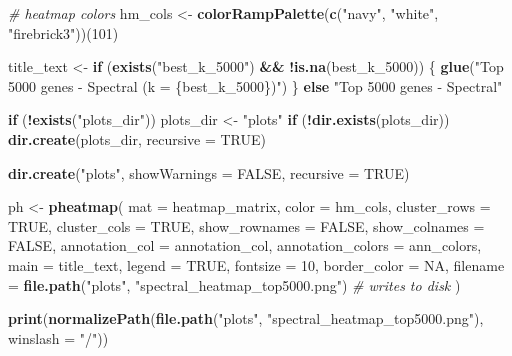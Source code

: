 \documentclass[
]{article}
\newenvironment{Shaded}{\begin{snugshade}}{\end{snugshade}}
\newcommand{\AttributeTok}[1]{\textcolor[rgb]{0.13,0.29,0.53}{#1}}
\newcommand{\CommentTok}[1]{\textcolor[rgb]{0.56,0.35,0.01}{\textit{#1}}}
\newcommand{\ConstantTok}[1]{\textcolor[rgb]{0.56,0.35,0.01}{#1}}
\newcommand{\ControlFlowTok}[1]{\textcolor[rgb]{0.13,0.29,0.53}{\textbf{#1}}}
\newcommand{\DecValTok}[1]{\textcolor[rgb]{0.00,0.00,0.81}{#1}}
\newcommand{\FunctionTok}[1]{\textcolor[rgb]{0.13,0.29,0.53}{\textbf{#1}}}
\newcommand{\NormalTok}[1]{#1}
\newcommand{\OtherTok}[1]{\textcolor[rgb]{0.56,0.35,0.01}{#1}}
\newcommand{\SpecialCharTok}[1]{\textcolor[rgb]{0.81,0.36,0.00}{\textbf{#1}}}
\newcommand{\StringTok}[1]{\textcolor[rgb]{0.31,0.60,0.02}{#1}}
\begin{document}
\begin{Shaded}
\begin{Highlighting}[]
\CommentTok{\# heatmap colors }
\NormalTok{hm\_cols }\OtherTok{\textless{}{-}} \FunctionTok{colorRampPalette}\NormalTok{(}\FunctionTok{c}\NormalTok{(}\StringTok{"navy"}\NormalTok{, }\StringTok{"white"}\NormalTok{, }\StringTok{"firebrick3"}\NormalTok{))(}\DecValTok{101}\NormalTok{)}

\NormalTok{title\_text }\OtherTok{\textless{}{-}} \ControlFlowTok{if}\NormalTok{ (}\FunctionTok{exists}\NormalTok{(}\StringTok{"best\_k\_5000"}\NormalTok{) }\SpecialCharTok{\&\&} \SpecialCharTok{!}\FunctionTok{is.na}\NormalTok{(best\_k\_5000)) \{}
  \FunctionTok{glue}\NormalTok{(}\StringTok{"Top 5000 genes {-} Spectral (k = \{best\_k\_5000\})"}\NormalTok{)}
\NormalTok{\} }\ControlFlowTok{else} \StringTok{"Top 5000 genes {-} Spectral"}


\ControlFlowTok{if}\NormalTok{ (}\SpecialCharTok{!}\FunctionTok{exists}\NormalTok{(}\StringTok{"plots\_dir"}\NormalTok{)) plots\_dir }\OtherTok{\textless{}{-}} \StringTok{"plots"}
\ControlFlowTok{if}\NormalTok{ (}\SpecialCharTok{!}\FunctionTok{dir.exists}\NormalTok{(plots\_dir)) }\FunctionTok{dir.create}\NormalTok{(plots\_dir, }\AttributeTok{recursive =} \ConstantTok{TRUE}\NormalTok{)}

\FunctionTok{dir.create}\NormalTok{(}\StringTok{"plots"}\NormalTok{, }\AttributeTok{showWarnings =} \ConstantTok{FALSE}\NormalTok{, }\AttributeTok{recursive =} \ConstantTok{TRUE}\NormalTok{)}

\NormalTok{ph }\OtherTok{\textless{}{-}} \FunctionTok{pheatmap}\NormalTok{(}
  \AttributeTok{mat =}\NormalTok{ heatmap\_matrix,}
  \AttributeTok{color =}\NormalTok{ hm\_cols,}
  \AttributeTok{cluster\_rows =} \ConstantTok{TRUE}\NormalTok{,}
  \AttributeTok{cluster\_cols =} \ConstantTok{TRUE}\NormalTok{,}
  \AttributeTok{show\_rownames =} \ConstantTok{FALSE}\NormalTok{,}
  \AttributeTok{show\_colnames =} \ConstantTok{FALSE}\NormalTok{,}
  \AttributeTok{annotation\_col =}\NormalTok{ annotation\_col,}
  \AttributeTok{annotation\_colors =}\NormalTok{ ann\_colors,}
  \AttributeTok{main =}\NormalTok{ title\_text,}
  \AttributeTok{legend =} \ConstantTok{TRUE}\NormalTok{,}
  \AttributeTok{fontsize =} \DecValTok{10}\NormalTok{,}
  \AttributeTok{border\_color =} \ConstantTok{NA}\NormalTok{,}
  \AttributeTok{filename =} \FunctionTok{file.path}\NormalTok{(}\StringTok{"plots"}\NormalTok{, }\StringTok{"spectral\_heatmap\_top5000.png"}\NormalTok{)  }\CommentTok{\# writes to disk}
\NormalTok{)}

\FunctionTok{print}\NormalTok{(}\FunctionTok{normalizePath}\NormalTok{(}\FunctionTok{file.path}\NormalTok{(}\StringTok{"plots"}\NormalTok{, }\StringTok{"spectral\_heatmap\_top5000.png"}\NormalTok{), }\AttributeTok{winslash =} \StringTok{"/"}\NormalTok{))}
\end{Highlighting}
\end{Shaded}
\end{document}

